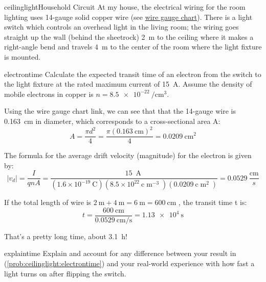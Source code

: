 \begin{mainquestion}{ceilinglight}{Household Circuit}
At my house, the electrical wiring for the room lighting uses 14-gauge solid copper wire (see \href{https://www.engineeringtoolbox.com/awg-wire-gauge-d_731.html}{wire gauge chart}). There is a light switch which controls an overhead light in the living room; the wiring goes straight up the wall (behind the sheetrock) \qty{2}{\meter} to the ceiling where it makes a right-angle bend and travels \qty{4}{\meter} to the center of the room where the light fixture is mounted.

\begin{partquestion}{electrontime}
{Calculate the expected transit time of an electron from the switch to the light fixture at the rated maximum current of \qty{15}{\ampere}. Assume the density of mobile electrons in copper is $n = \qty{8.5e-22}{\per\centi\meter\cubed}$.}

\begin{answer}
Using the wire gauge chart link, we can see that that the 14-gauge wire is \qty{0.163}{\centi\meter} in diameter, which corresponds to a cross-sectional area A: 
\[
A = \frac{\pi d^2}{4}
  = \frac{\pi (\qty{0.163}{\centi\meter})^2}{4}
  = \qty{0.0209}{\centi\meter\squared}
\]

The formula for the average drift velocity (magnitude) for the electron is given by:
\[
\left|v_d\right|=\frac{I}{qnA}=\frac{15\mathrm{\ \operatorname{A}} }{\left(1.6\times10^{-19}\mathrm{\ C} \right)\left(8.5\times10^{22}\mathrm{\ c} \mathrm{\operatorname{m}}^{-3}\right)\left(0.0209\mathrm{\ c}\mathrm{\operatorname{m}}^2\right)}=0.0529\ \frac{\mathrm{cm} }{s}
\]

If the total length of wire is $\qty{2}{\meter} + \qty{4}{\meter} = \qty{6}{\meter} = \qty{600}{\centi\meter}$ , the transit time t is:
\[
t = \frac{\qty{600}{\centi\meter}}{\qty{0.0529}{\centi\meter\per\second}}
  = \qty{1.13e4}{\second}
\]

That's a pretty long time, about \qty{3.1}{\hour}!
\end{answer}
\end{partquestion}

\begin{partquestion}{explaintime}
{Explain and account for any difference between your result in (\cref{prob:ceilinglight:electrontime}) and your real-world experience with how fast a light turns on after flipping the switch.}


\end{partquestion}
\end{mainquestion}
